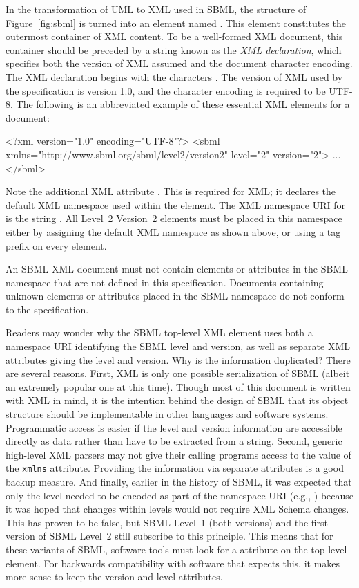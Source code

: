 In the transformation of UML to XML used in SBML, the structure of
Figure~\ref{fig:sbml} is turned into an element named
.  This element constitutes the outermost container of
XML content.  To be a well-formed XML document, this container
should be preceded by a string known as the \emph{XML
  declaration}, which specifies both the version of XML assumed
and the document character encoding.  The XML declaration begins
with the characters .  The version of XML used by the
\sbmltwotwo specification is version 1.0, and the character
encoding is required to be UTF-8.  The following is an abbreviated
example of these essential XML elements for a \sbmltwotwo
document:

\begin{example}
<?xml version="1.0" encoding="UTF-8"?>
<sbml xmlns="http://www.sbml.org/sbml/level2/version2" level="2" version="2">
  ...
</sbml>
\end{example}

Note the additional XML attribute .  This is required
for XML; it declares the default XML namespace used within the
 element.  The XML namespace URI for \sbmltwotwo is
the string .  All
Level~2 Version~2 elements must be placed in this namespace either
by assigning the default XML namespace as shown above, or using a
tag prefix on every element.

An SBML XML document must not contain elements or attributes in
the SBML namespace that are not defined in this \sbmltwotwo
specification.  Documents containing unknown elements or
attributes placed in the SBML namespace do not conform to the
\sbmltwotwo specification.

Readers may wonder why the SBML top-level XML element uses both a
namespace URI identifying the SBML level and version, as well as
separate XML attributes giving the level and version.  Why is the
information duplicated?  There are several reasons.  First, XML is
only one possible serialization of SBML (albeit an extremely
popular one at this time).  Though most of this document is
written with XML in mind, it is the intention behind the design of
SBML that its object structure should be implementable in other
languages and software systems.  Programmatic access is easier if
the level and version information are accessible directly as data
rather than have to be extracted from a string.  Second, generic
high-level XML parsers may not give their calling programs access
to the value of the \texttt{xmlns} attribute.  Providing the
information via separate attributes is a good backup measure.  And
finally, earlier in the history of SBML, it was expected that only
the level needed to be encoded as part of the namespace URI (e.g.,
) because it was hoped that
changes within levels would not require XML Schema changes.  This
has proven to be false, but SBML Level~1 (both versions) and the
first version of SBML Level~2 still subscribe to this principle.
This means that for these variants of SBML, software tools must
look for a  attribute on the top-level element.
For backwards compatibility with software that expects this, it
makes more sense to keep the version and level attributes.


